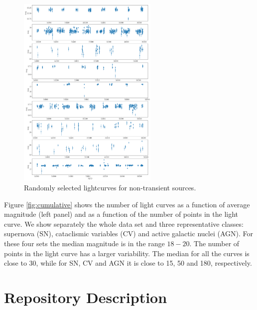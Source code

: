 \documentclass[a4paper,fleqn,usenatbib]{mnras}
\begin{document}
\begin{figure}
  \includegraphics[width=0.6\textwidth]{examples_nontransient.pdf}
  \caption{Randomly selected lightcurves for non-transient sources.}
  \label{fig:examples_non_transient}
\end{figure} 

Figure \ref{fig:cumulative} shows the number of light curves as a
function of average magnitude (left panel) and as a function of the
number of points in the light curve.
We show separately the whole data set and three representative
classes: supernova (SN), cataclismic variables (CV) and active galactic nuclei (AGN).
For these four sets the median magnitude is in the range $18-20$. 
The number of points in the light curve has a larger variability.
The median for all the curves is close to 30, while for SN, CV and
AGN it is close to 15, 50 and 180, respectively.

\section{Repository Description} 
\label{sec:repository}
\end{document}
